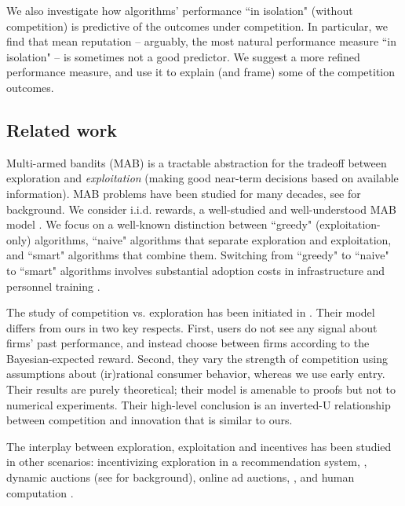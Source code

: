 \documentclass[../competing_bandits_with_appendix.tex]{subfiles}
\begin{document}
We also investigate how algorithms' performance ``in isolation" (without competition) is predictive of the outcomes under competition. In particular, we find that mean reputation -- arguably, the most natural performance measure ``in isolation" -- is sometimes not a good predictor. We suggest a more refined performance measure, and use it to explain (and frame) some of the competition outcomes.


\subsection{Related work}

 Multi-armed bandits (MAB) is a tractable abstraction for the tradeoff between exploration and \emph{exploitation} (making good near-term decisions based on available information). MAB problems have been studied for many decades, see \cite{Bubeck-survey12} for background. We consider i.i.d. rewards, a well-studied and well-understood MAB model \cite{bandits-ucb1}. We focus on a well-known distinction between ``greedy" (exploitation-only) algorithms, ``naive" algorithms that separate exploration and exploitation, and ``smart" algorithms that combine them. Switching from ``greedy" to ``naive" to ``smart" algorithms involves substantial adoption costs in infrastructure and personnel training \cite{MWT-WhitePaper-2016,DS-arxiv}.

The study of competition vs. exploration has been initiated in \cite{CompetingBandits-itcs16}. Their model differs from ours in two key respects. First, users do not see any signal about firms' past performance, and instead choose between firms according to the Bayesian-expected reward. Second, they vary the strength of competition using assumptions about (ir)rational consumer behavior, whereas we use early entry. Their results are purely theoretical; their model is amenable to proofs but not to numerical experiments. Their high-level conclusion is an inverted-U relationship between competition and innovation that is similar to ours.

The interplay between exploration, exploitation and incentives has been studied in other scenarios: incentivizing exploration in a recommendation system,
    \eg \cite{Kremer-JPE14,Frazier-ec14,Che-13,ICexploration-ec15,Bimpikis-exploration-ms17},
dynamic auctions
    (see \cite{DynAuctions-survey10} for background),
online ad auctions, \eg
    \cite{MechMAB-ec09,DevanurK09,NSV08,Transform-ec10-jacm,Amin-auctions-nips13},
and human computation
    \cite{RepeatedPA-ec14,Ghosh-itcs13,Krause-www13}.
\end{document}
